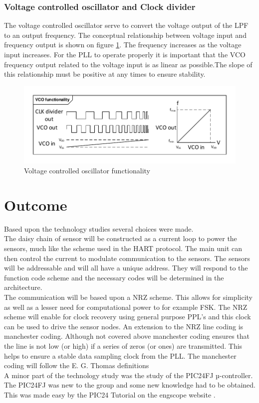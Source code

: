 \subsubsection{Voltage controlled oscillator and Clock divider}
The voltage controlled oscillator serve to convert the voltage output of the LPF to an output frequency. The conceptual relationship between voltage input and frequency output is shown on figure \ref{fig:VCO_func}. The frequency increases as the voltage input increases. For the PLL to operate properly it is important that the VCO frequency output related to the voltage input is as linear as possible.The slope of this relationship must be positive at any times to ensure stability.
\begin{figure}[H]
	\centering
	\includegraphics[width=1\textwidth]{billeder/10technologystudies/VCO_functionality}
	\caption{Voltage controlled oscillator functionality}
	\label{fig:VCO_func}
\end{figure}

\section{Outcome}
Based upon the technology studies several choices were made.\\
The daisy chain of sensor will be constructed as a current loop to power the sensors, much like the scheme used in the HART protocol. The main unit can then control the current to modulate communication to the sensors. The sensors will be addressable and will all have a unique address. They will respond to the function code scheme and the necessary codes will be determined in the architecture.\\
The communication will be based upon a NRZ scheme. This allows for simplicity as well as a lesser need for computational power to for example FSK. The NRZ scheme will enable for clock recovery using general purpose PPL's and this clock can be used to drive the sensor nodes. An extension to the NRZ line coding is manchester coding\cite{MC}. Although not covered above manchester coding ensures that the line is not low (or high) if a series of zeros (or ones) are transmitted. This helps to ensure a stable data sampling clock from the PLL. The manchester coding will follow the E. G. Thomas definitions\\
A minor part of the technology study was the study of the PIC24FJ µ-controller. The PIC24FJ was new to the group and some new knowledge had to be obtained. This was made easy by the PIC24 Tutorial on the engscope website \citep{Engscope}.



